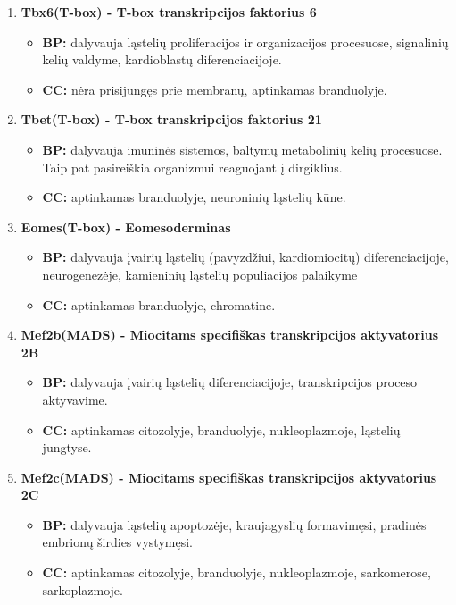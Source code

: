 \documentclass[12pt]{article}
\begin{document}
\begin{enumerate}
    \item \textbf{Tbx6(T-box)\cite{TBX6} - T-box transkripcijos faktorius 6}
        \begin{itemize}
            \item \textbf{BP:} dalyvauja ląstelių proliferacijos ir
                organizacijos procesuose, signalinių kelių valdyme,
                kardioblastų diferenciacijoje.
            \item \textbf{CC:} nėra prisijungęs prie membranų, aptinkamas
                branduolyje.
        \end{itemize}

    \item \textbf{Tbet(T-box)\cite{TBET} - T-box transkripcijos faktorius 21}
        \begin{itemize}
            \item \textbf{BP:} dalyvauja imuninės sistemos, baltymų metabolinių
                kelių procesuose. Taip pat pasireiškia organizmui reaguojant į
                dirgiklius.
            \item \textbf{CC:} aptinkamas branduolyje, neuroninių ląstelių kūne.
        \end{itemize}

    \item \textbf{Eomes(T-box)\cite{EOMES} - Eomesoderminas}
        \begin{itemize}
            \item \textbf{BP:} dalyvauja įvairių ląstelių (pavyzdžiui,
                kardiomiocitų) diferenciacijoje, neurogenezėje, kamieninių
                ląstelių populiacijos palaikyme
            \item \textbf{CC:} aptinkamas branduolyje, chromatine.
        \end{itemize}

    \item \textbf{Mef2b(MADS)\cite{MEF2B} - Miocitams specifiškas
                  transkripcijos aktyvatorius 2B}
        \begin{itemize}
            \item \textbf{BP:} dalyvauja įvairių ląstelių diferenciacijoje,
                transkripcijos proceso aktyvavime.
            \item \textbf{CC:} aptinkamas citozolyje, branduolyje,
                nukleoplazmoje, ląstelių jungtyse.
        \end{itemize}

    \item \textbf{Mef2c(MADS)\cite{MEF2C} - Miocitams specifiškas
                  transkripcijos aktyvatorius 2C}
        \begin{itemize}
            \item \textbf{BP:} dalyvauja ląstelių apoptozėje, kraujagyslių
                formavimęsi, pradinės embrionų širdies vystymęsi.
            \item \textbf{CC:} aptinkamas citozolyje, branduolyje,
                nukleoplazmoje, sarkomerose, sarkoplazmoje.
        \end{itemize}


\end{enumerate}
\end{document}
